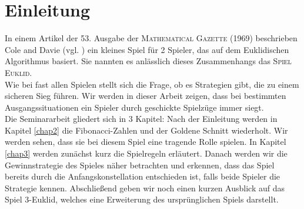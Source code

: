 \chapter{Einleitung}
%
In einem Artikel der 53. Ausgabe der \textsc{Mathematical Gazette} (1969) beschrieben Cole and Davie (vgl. \cite{cole69}) ein kleines Spiel für 2 Spieler, das auf dem Euklidischen Algorithmus basiert. Sie nannten es anlässlich dieses Zusammenhangs das \textsc{Spiel Euklid}.\\
Wie bei fast allen Spielen stellt sich die Frage, ob es Strategien gibt, die zu einem sicheren Sieg führen. Wir werden in dieser Arbeit zeigen, dass bei bestimmten Ausgangssituationen ein Spieler durch geschickte Spielzüge immer siegt.\\
Die Seminararbeit gliedert sich in 3 Kapitel: Nach der Einleitung werden in Kapitel \ref{chap2} die Fibonacci-Zahlen und der Goldene Schnitt wiederholt. Wir werden sehen, dass sie bei diesem Spiel eine tragende Rolle spielen. In Kapitel \ref{chap3} werden zunächst kurz die Spielregeln erläutert. Danach werden wir die Gewinnstrategie des Spieles näher betrachten und erkennen, dass das Spiel bereits durch die Anfangskonstellation entschieden ist, falls beide Spieler die Strategie kennen. Abschließend geben wir noch einen kurzen Ausblick auf das Spiel 3-Euklid, welches eine Erweiterung des ursprünglichen Spiels darstellt.
